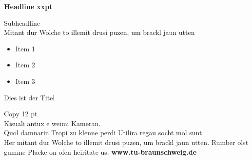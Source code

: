 \documentclass[a3paper,13pt]{tubsposter}
\begin{document}
\begin{tubsposter}
  \showtubslogo
  \begin{posterrow}[bgcolor=tuRed100]{2}
      \color{tuWhite}
      {\Huge\bfseries Headline xxpt\bigskip}
      
      \Large Subheadline\\
      Mitant dur Wolche to illemit drusi puzen, um brackl jaun utten
      \vfill
      \large
      \begin{itemize}
        \item Item 1
        \item Item 2
        \item Item 3
      \end{itemize}
  \end{posterrow}
  \begin{posterrow}[bgcolor=tuGray20]{3}
      \Large Dies ist der Titel
  \end{posterrow}
  \begin{posterrow}[bgcolor=tuRed40]{3}
    Copy 12 pt\\
    Kisuali antux e weimi Kameran.\\
    Quol damnarin Tropi zu klenne perdi Utilira regau socht mol sunt.\\
    Her mitant dur Wolche to illemit drusi puzen, um brackl jaun utten. Rumber olst gumme Placke on ofen heiritate us.
    \vfill
    \textbf{www.tu-braunschweig.de}
  \end{posterrow}
\end{tubsposter}
\end{document}
